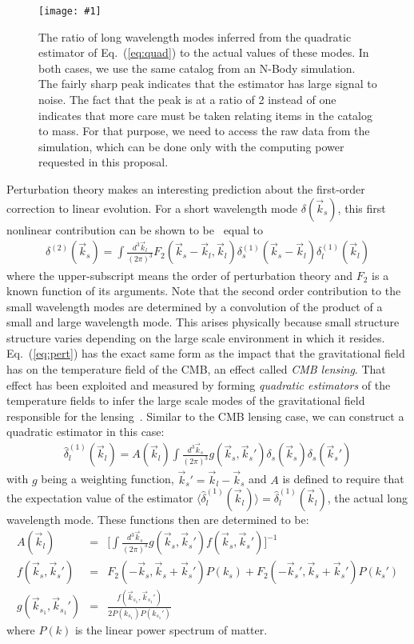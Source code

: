 \documentclass[12pt]{article}
\newcommand{\sfig}[2]{
\begin{center}
\texttt{[image: \#1]}
\end{center}
        }
\newcommand{\Spng}[2]{
    \begin{figure}[htb]
    \sfig{#1.png}{.9\columnwidth}
    \caption{{\small #2}}
    \label{fig:#1}
    \end{figure}
}
\newcommand{\ec}[1]{Eq.~(\ref{eq:#1})}
\newcommand{\eql}[1]{\label{eq:#1}}
\begin{document}
\begin{small}
\Spng{nbody}{The ratio of long wavelength modes inferred from the quadratic estimator of \ec{quad} to the actual values of these modes. In both cases, we use the same catalog from an N-Body simulation. The fairly sharp peak indicates that the estimator has large signal to noise. The fact that the peak is at a ratio of 2 instead of one indicates that more care must be taken relating items in the catalog to mass. For that purpose, we need to access the raw data from the simulation, which can be done only with the computing power requested in this proposal.}


Perturbation theory makes an interesting prediction about the first-order correction to linear evolution. For a short wavelength mode $\delta(\vec{k}_s)$, this first nonlinear contribution can be shown to be~\cite{Bernardeau:2001qr} equal to 
\begin{eqnarray}
\delta^{(2)}(\vec{k}_s)=\int\frac{d^{3}\vec{k}_l}{(2 \pi)^3}F_2(\vec{k}_s-\vec{k}_l,\vec{k}_l)\delta_{s}^{(1)}(\vec{k}_s-\vec{k}_l)\delta_l^{(1)}(\vec{k}_l)\eql{pert}
\end{eqnarray}
where the upper-subscript means the order of perturbation theory and $F_2$ is a known function of its arguments. Note that the second order contribution to the small wavelength modes are determined by a convolution of the product of a small and large wavelength mode. 
This arises physically because small structure structure varies depending on the large scale environment in which it resides. \ec{pert} has the exact same form as the impact that the gravitational field has on the temperature field of the CMB, an effect called \emph{CMB lensing}. That effect has been exploited and measured by forming \emph{quadratic estimators} of the temperature fields to infer the large scale modes of the gravitational field responsible for the lensing~\cite{Hu:2001tn}.
Similar to the CMB lensing case, we can construct a quadratic estimator in this case:
\begin{eqnarray}
\hat{\delta}_l^{(1)}(\vec{k}_l)=A(\vec{k}_l)\int \frac{d^3 \vec{k}_s}{(2\pi)^3} g(\vec{k}_s,\vec{k}_s')\delta_s(\vec{k}_s)\delta_s(\vec{k}_s')\eql{quad}
\end{eqnarray}
with $g$ being a weighting function, $\vec{k}_s'=\vec{k}_l-\vec{k}_s$ and $A$ is defined to require that the expectation value of the estimator $\langle \hat{\delta}_l^{(1)}(\vec{k}_l) \rangle=\hat{\delta}_l^{(1)}(\vec{k}_l)$, the actual long wavelength mode. These functions then are determined to be:
\begin{eqnarray}
A(\vec{k}_l)&=&\bigg[\int \frac{d^3 \vec{k}_s}{(2\pi)^3} g(\vec{k}_s,\vec{k}_s')f(\vec{k}_s,\vec{k}_s')  \bigg]^{-1} \\
f(\vec{k}_s,\vec{k}_s')&=&F_2(-\vec{k}_s,\vec{k}_s+\vec{k}_s')P(k_s)+F_2(-\vec{k}_s',\vec{k}_s+\vec{k}_s')P(k_s') \\
g(\vec{k}_{s_1},\vec{k}_{s_1}')&=&\frac{f(\vec{k}_{s_1},\vec{k}_{s_1}')}{2P(k_{s_1})P(k_{s_1}')}
\end{eqnarray}
where $P(k)$ is the linear power spectrum of matter.


\end{small}
\end{document}
